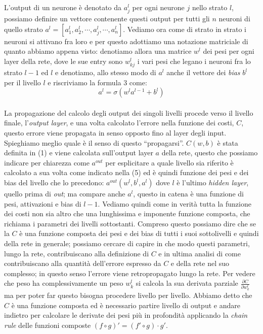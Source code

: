 L'output di un neurone è denotato da $ a^{l}_{j} $ per ogni neurone $j$ nello strato $l$, possiamo definire un vettore contenente questi output per tutti gli $n$ neuroni di quello strato $a^{l} = \left[a^{l}_{1},a^{l}_{2}, \cdots, a^{l}_{j}, \cdots, a^{l}_{n}  \right] $. Vediamo ora come di strato in strato i neuroni si attivano fra loro e per questo adottiamo una notazione matriciale di quanto abbiamo appena visto: denotiamo allora una matrice $w^{l}$ dei pesi per ogni layer della rete, dove le sue entry sono $w^{l}_{kj}$ i vari pesi che legano i neuroni fra lo strato $l-1$ ed $l$ e denotiamo, allo stesso modo di $a^{l}$ anche il vettore dei \textit{bias} $b^{l}$ per il livello $l$ e riscriviamo la formula 3 come:
\begin{equation}
	a^{l}=\sigma\left( w^{l}a^{l-1}+b^{l}\right)
\end{equation}
\\
La propagazione del calcolo degli output dei singoli livelli procede verso il livello finale, l'\textit{output layer}, e una volta calcolato l'errore nella funzione dei costi, $C$, questo errore viene propagata in senso opposto fino al layer degli input. Spieghiamo meglio quale è il senso di questo ``propagarsi''. 
$C(w,b)$ è stata definita in (1) e viene calcolata sull'output layer $a$ della rete, questo che possiamo indicare per chiarezza come $a^{out}$ per esplicitare a quale livello sia riferito è calcolato a sua volta come indicato nella (5) ed   è quindi funzione dei pesi e dei bias del livello che lo precedono: $ a^{out}(w^{l},b^{l}, a^{l})$ dove $l$ è l'ultimo \textit{hidden layer}, quello prima di \textit{out}; ma compare anche $a^{l}$, questo in catena è una funzione di pesi, attivazioni e bias di $l-1$. Vediamo quindi come in verità tutta la funzione dei costi non sia altro che una lunghissima e imponente funzione composta, che richiama i parametri dei livelli sottostanti. Compreso questo possiamo dire che se la $C$ è una funzione composta dei pesi e dei bias di tutti i suoi sottolivelli e quindi della rete in generale; possiamo cercare di capire in che modo questi parametri, lungo la rete, contribuiscano alla definizione di $C$ e in ultima analisi di come contribuiscano alla quantità dell'errore espresso da $C$ e della rete nel suo complesso; in questo senso l'errore viene retropropagato lungo la rete. Per vedere che peso ha complessivamente un peso $w_{k}^{l}$ si calcola la sua derivata parziale $\frac{\partial C}{\partial w_{k}^{l}}$ ma per poter far questo bisogna procedere livello per livello. Abbiamo detto che $C$ è una funzione composta ed è necessario partire livello di output e andare indietro per calcolare le derivate dei pesi più in profondità applicando la \textit{chain rule} delle funzioni composte $(f \circ g)'=(f' \circ g) \cdot g' $.

